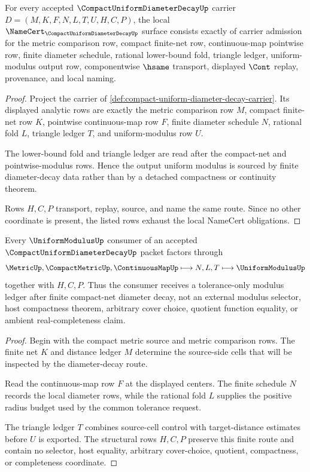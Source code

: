 \begin{theorem}
\label{thm:compact-uniform-diameter-decay-namecert-obligations}
For every accepted $\CompactUniformDiameterDecayUp$ carrier $D=(M,K,F,N,L,T,U,H,C,P)$, the local $\NameCert_{\CompactUniformDiameterDecayUp}$ surface consists exactly of carrier admission for the metric comparison row, compact finite-net row, continuous-map pointwise row, finite diameter schedule, rational lower-bound fold, triangle ledger, uniform-modulus output row, componentwise $\hsame$ transport, displayed $\Cont$ replay, provenance, and local naming.
\end{theorem}
\begin{proof}
Project the carrier of \autoref{def:compact-uniform-diameter-decay-carrier}. Its displayed analytic rows are exactly the metric comparison row $M$, compact finite-net row $K$, pointwise continuous-map row $F$, finite diameter schedule $N$, rational fold $L$, triangle ledger $T$, and uniform-modulus row $U$.

The lower-bound fold and triangle ledger are read after the compact-net and pointwise-modulus rows. Hence the output uniform modulus is sourced by finite diameter-decay data rather than by a detached compactness or continuity theorem.

Rows $H,C,P$ transport, replay, source, and name the same route. Since no other coordinate is present, the listed rows exhaust the local NameCert obligations.
\end{proof}

\begin{theorem}
\label{thm:compact-uniform-diameter-decay-uniform-modulus-handoff}
Every $\UniformModulusUp$ consumer of an accepted $\CompactUniformDiameterDecayUp$ packet factors through
$$
\MetricUp,\CompactMetricUp,\ContinuousMapUp \longmapsto N,L,T \longmapsto \UniformModulusUp
$$
together with $H,C,P$. Thus the consumer receives a tolerance-only modulus ledger after finite compact-net diameter decay, not an external modulus selector, host compactness theorem, arbitrary cover choice, quotient function equality, or ambient real-completeness claim.
\end{theorem}
\begin{proof}
Begin with the compact metric source and metric comparison rows. The finite net $K$ and distance ledger $M$ determine the source-side cells that will be inspected by the diameter-decay route.

Read the continuous-map row $F$ at the displayed centers. The finite schedule $N$ records the local diameter rows, while the rational fold $L$ supplies the positive radius budget used by the common tolerance request.

The triangle ledger $T$ combines source-cell control with target-distance estimates before $U$ is exported. The structural rows $H,C,P$ preserve this finite route and contain no selector, host equality, arbitrary cover-choice, quotient, compactness, or completeness coordinate.
\end{proof}

